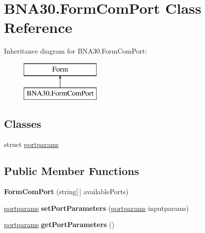 \hypertarget{class_b_n_a30_1_1_form_com_port}{}\section{B\+N\+A30.\+Form\+Com\+Port Class Reference}
\label{class_b_n_a30_1_1_form_com_port}
Inheritance diagram for B\+N\+A30.\+Form\+Com\+Port\+:\begin{figure}[H]
\begin{center}
\leavevmode
\includegraphics[height=2.000000cm]{class_b_n_a30_1_1_form_com_port}
\end{center}
\end{figure}
\subsection*{Classes}
\begin{DoxyCompactItemize}
\item 
struct \mbox{\hyperlink{struct_b_n_a30_1_1_form_com_port_1_1portparams}{portparams}}
\end{DoxyCompactItemize}
\subsection*{Public Member Functions}
\begin{DoxyCompactItemize}
\item 
\mbox{\label{class_b_n_a30_1_1_form_com_port_a890c751f47d4e7d2af4546f92c3a5020}} 
{\bfseries Form\+Com\+Port} (string\mbox{[}$\,$\mbox{]} available\+Ports)
\item 
\mbox{\label{class_b_n_a30_1_1_form_com_port_a055540222aedc1e09b7fe28c8edee1cc}} 
\mbox{\hyperlink{struct_b_n_a30_1_1_form_com_port_1_1portparams}{portparams}} {\bfseries set\+Port\+Parameters} (\mbox{\hyperlink{struct_b_n_a30_1_1_form_com_port_1_1portparams}{portparams}} inputparams)
\item 
\mbox{\label{class_b_n_a30_1_1_form_com_port_a4786cc5dfd1ef839cdf55075bd79ac2d}} 
\mbox{\hyperlink{struct_b_n_a30_1_1_form_com_port_1_1portparams}{portparams}} {\bfseries get\+Port\+Parameters} ()
\end{DoxyCompactItemize}
